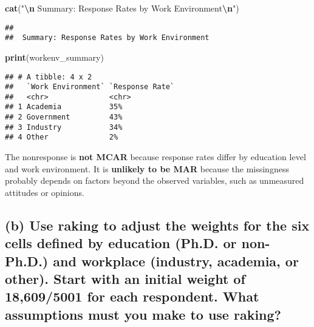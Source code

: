 \documentclass[]{article}
\newenvironment{Shaded}{\begin{snugshade}}{\end{snugshade}}
\newcommand{\FunctionTok}[1]{\textcolor[rgb]{0.13,0.29,0.53}{\textbf{#1}}}
\newcommand{\NormalTok}[1]{#1}
\newcommand{\SpecialCharTok}[1]{\textcolor[rgb]{0.81,0.36,0.00}{\textbf{#1}}}
\newcommand{\StringTok}[1]{\textcolor[rgb]{0.31,0.60,0.02}{#1}}
\begin{document}
\begin{Shaded}
\begin{Highlighting}[]
\FunctionTok{cat}\NormalTok{(}\StringTok{"}\SpecialCharTok{\textbackslash{}n}\StringTok{ Summary: Response Rates by Work Environment}\SpecialCharTok{\textbackslash{}n}\StringTok{"}\NormalTok{)}
\end{Highlighting}
\end{Shaded}

\begin{verbatim}
## 
##  Summary: Response Rates by Work Environment
\end{verbatim}

\begin{Shaded}
\begin{Highlighting}[]
\FunctionTok{print}\NormalTok{(workenv\_summary)}
\end{Highlighting}
\end{Shaded}

\begin{verbatim}
## # A tibble: 4 x 2
##   `Work Environment` `Response Rate`
##   <chr>              <chr>          
## 1 Academia           35%            
## 2 Government         43%            
## 3 Industry           34%            
## 4 Other              2%
\end{verbatim}

The nonresponse is \textbf{not MCAR} because response rates differ by education level and work environment. It is \textbf{unlikely to be MAR} because the missingness probably depends on factors beyond the observed variables, such as unmeasured attitudes or opinions.

\newpage
\subsection{(b) Use raking to adjust the weights for the six cells defined by education (Ph.D. or non-Ph.D.) and workplace (industry, academia, or other). Start with an initial weight of 18,609/5001 for each respondent. What assumptions must you make to use raking?}
\end{document}
